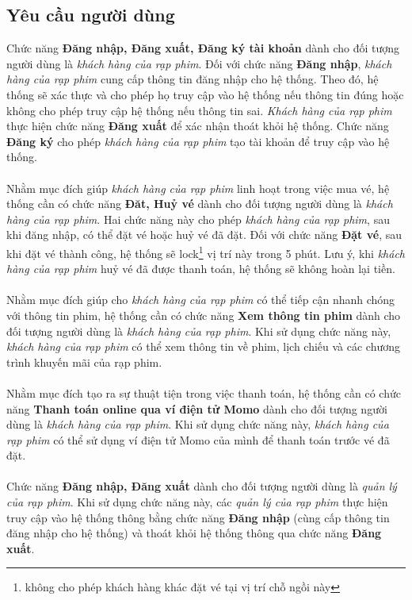 \documentclass[a4paper, 12pt]{article}
\begin{document}
    \subsection{Yêu cầu người dùng}
    Chức năng \textbf{Đăng nhập, Đăng xuất, Đăng ký tài khoản} dành cho đối tượng người dùng là \textit{khách hàng của rạp phim}. Đối với chức năng \textbf{Đăng nhập}, \textit{khách hàng của rạp phim} cung cấp thông tin đăng nhập cho hệ thống. Theo đó, hệ thống sẽ xác thực và cho phép họ truy cập vào hệ thống nếu thông tin đúng hoặc không cho phép truy cập hệ thống nếu thông tin sai.
    \textit{Khách hàng của rạp phim} thực hiện chức năng \textbf{Đăng xuất} để xác nhận thoát khỏi hệ thống. Chức năng \textbf{Đăng ký} cho phép \textit{khách hàng của rạp phim} tạo tài khoản để truy cập vào hệ thống.
    \\\\
    Nhằm mục đích giúp \textit{khách hàng của rạp phim} linh hoạt trong việc mua vé, hệ thống cần có chức năng \textbf{Đăt, Huỷ vé} dành cho đối tượng người dùng là \textit{khách hàng của rạp phim}. Hai chức năng này cho phép \textit{khách hàng của rạp phim}, sau khi đăng nhập, có thể đặt vé hoặc huỷ vé đã đặt. Đối với chức năng \textbf{Đặt vé}, sau khi đặt vé thành công, hệ thống sẽ lock\footnote{không cho phép khách hàng khác đặt vé tại vị trí chỗ ngồi này} vị trí này trong 5 phút. Lưu ý, khi \textit{khách hàng của rạp phim} huỷ vé đã được thanh toán, hệ thống sẽ không hoàn lại tiền.
    \\\\
    Nhằm mục đích giúp cho \textit{khách hàng của rạp phim} có thể tiếp cận nhanh chóng với thông tin phim, hệ thống cần có chức năng \textbf{Xem thông tin phim} dành cho đối tượng người dùng là \textit{khách hàng của rạp phim}. Khi sử dụng chức năng này, \textit{khách hàng của rạp phim} có thể xem thông tin về phim, lịch chiếu và các chương trình khuyến mãi của rạp phim.
    \\\\
    Nhằm mục đích tạo ra sự thuật tiện trong việc thanh toán, hệ thống cần có chức năng \textbf{Thanh toán online qua ví điện tử Momo} dành cho đối tượng người dùng là \textit{khách hàng của rạp phim}. Khi sử dụng chức năng này, \textit{khách hàng của rạp phim} có thể sử dụng ví điện tử Momo của mình để thanh toán trước vé đã đặt.
    \\\\
    Chức năng \textbf{Đăng nhập, Đăng xuất} dành cho đối tượng người dùng là \textit{quản lý của rạp phim}. Khi sử dụng chức năng này, các \textit{quản lý của rạp phim} thực hiện truy cập vào hệ thống thông bằng chức năng \textbf{Đăng nhập} (cùng cấp thông tin đăng nhập cho hệ thống) và thoát khỏi hệ thống thông qua chức năng \textbf{Đăng xuất}.
\end{document}
